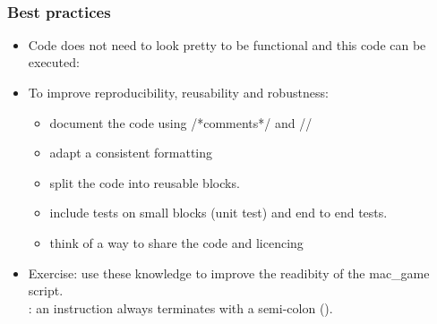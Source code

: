 \begin{frame}
  \begin{example}[Loops]~\par
    
  \end{example}
\end{frame}

\begin{frame}[fragile]
	\frametitle<presentation>{Best practices}
	\begin{itemize}
		\item<1-> Code does not need to look pretty to be
		functional and this code can be executed:\par
		
		\item<2-> To improve reproducibility, reusability and robustness:
		\begin{itemize}
			\item document the code using  \textcolor{green!50!black}{/*comments*/} and  \textcolor{green!50!black}{//}
			\item adapt a consistent formatting
			\item split the code into reusable blocks.
			\item include tests on small blocks (unit test) and end to end tests.
			\item think of a way to share the code and licencing
		\end{itemize}
		\item<3-> Exercise: use these knowledge to improve the readibity of the mac\_game script. \\ : an instruction always terminates with a semi-colon (\kw{;}).
	\end{itemize}
\end{frame}

